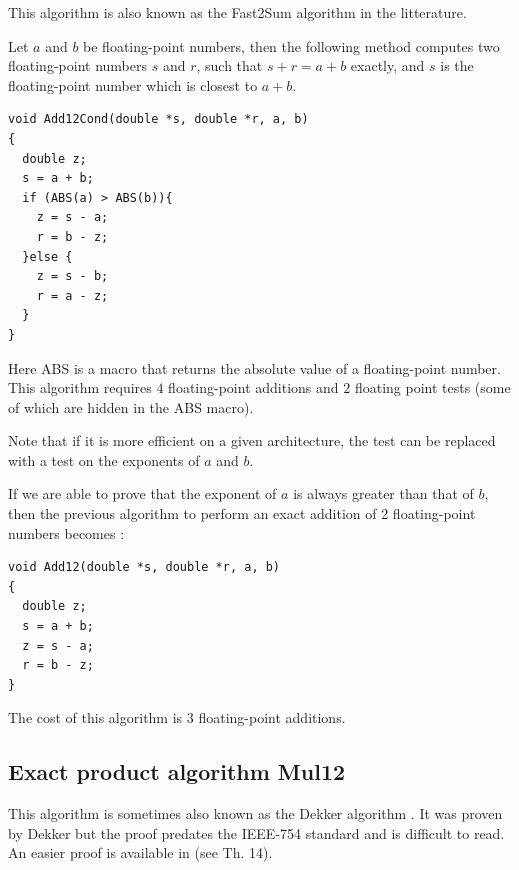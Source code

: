 This algorithm is also known as the Fast2Sum algorithm in the
litterature.
\begin{theorem}
  Let $a$ and $b$ be floating-point numbers, then the following method
  computes two floating-point numbers $s$ and $r$, such that $s+r =
  a+b$ exactly, and $s$ is the floating-point number which is closest
  to $a+b$.

\begin{lstlisting}[label={lst:Add12Cond},caption={Add12Cond},firstnumber=1]
void Add12Cond(double *s, double *r, a, b) 
{
  double z;
  s = a + b;            
  if (ABS(a) > ABS(b)){  
    z = s - a;           
    r = b - z;           
  }else {                 
    z = s - b;           
    r = a - z;           
  } 
}                         
\end{lstlisting}
Here ABS is a macro that returns the absolute value of a
floating-point number. This algorithm requires $4$ floating-point additions and $2$ floating
point tests (some of which are hidden in the ABS macro). 

Note that if it is more efficient on a given architecture, the test can be replaced
with a test on the exponents of $a$ and $b$.

\end{theorem}


If we are able to prove that  the exponent of $a$ is always greater than that
of $b$, then the previous algorithm to perform an exact addition of 2
floating-point numbers becomes :
\begin{lstlisting}[label={lst:Add12},caption={Add12},firstnumber=1]
void Add12(double *s, double *r, a, b) 
{
  double z;
  s = a + b;            
  z = s - a;  
  r = b - z; 
}            
\end{lstlisting}
The cost of this algorithm is $3$ floating-point additions.






\subsection{Exact product algorithm {Mul12}}

This algorithm is sometimes also known as the Dekker algorithm
\cite{Dek71}. It was proven by Dekker but the proof predates the
IEEE-754 standard and is difficult to read. An easier proof is
available in \cite{Gol91} (see Th. 14).


